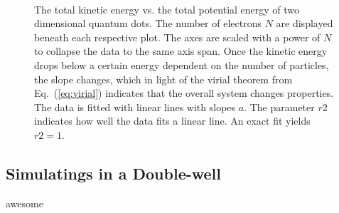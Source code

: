 \begin{figure}[h]
 \begin{center}
   \\
  \caption{The total kinetic energy vs. the total potential energy of two dimensional quantum dots. The number of electrons $N$ are displayed beneath each respective plot. The axes are scaled with a power of $N$ to collapse the data to the same axis span. Once the kinetic energy drops below a certain energy dependent on the number of particles, the slope changes, which in light of the virial theorem from Eq.~(\ref{eq:virial}) indicates that the overall system changes properties. The data is fitted with linear lines with slopes $a$. The parameter $r2$ indicates how well the data fits a linear line. An exact fit yields $r2 = 1$.}
  \label{fig:V_dist_qdots}
 \end{center}
\end{figure}
\captionsetup[subfloat]{labelformat=parens}

\subsection{Simulatings in a Double-well}

awesome